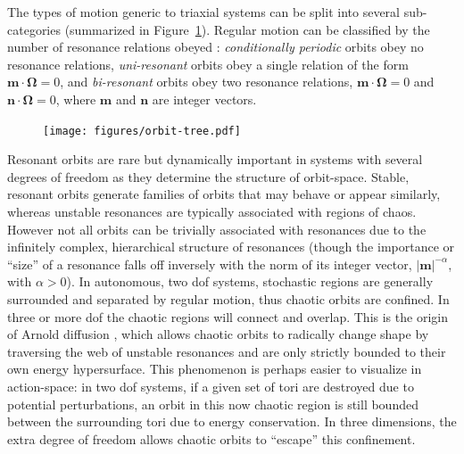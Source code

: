 \documentclass[letterpaper,12pt,preprint]{aastex}
\newcommand{\bs}[1]{\boldsymbol{#1}}
\begin{document}
The types of motion generic to triaxial systems can be split into several sub-categories (summarized in Figure~\ref{fig:orbit-tree}). Regular motion can be classified by the number of resonance relations obeyed \citep[e.g.,][]{lichtenberg83, valluri98}: \emph{conditionally periodic} orbits obey no resonance relations, \emph{uni-resonant} orbits obey a single relation of the form $\bs{m}\cdot\bs{\Omega}=0$, and \emph{bi-resonant} orbits obey two resonance relations, $\bs{m}\cdot\bs{\Omega}=0$ and $\bs{n}\cdot\bs{\Omega}=0$, where $\bs{m}$ and $\bs{n}$ are integer vectors.

\begin{figure}[!h]
\begin{center}
\texttt{[image: figures/orbit-tree.pdf]}
\caption{} \label{fig:orbit-tree}
\end{center}
\end{figure}

Resonant orbits are rare \citep{merritt99} but dynamically important in systems with several degrees of freedom as they determine the structure of orbit-space. Stable, resonant orbits generate families of orbits that may behave or appear similarly, whereas unstable resonances are typically associated with regions of chaos. However not all orbits can be trivially associated with resonances due to the infinitely complex, hierarchical structure of resonances (though the importance or ``size'' of a resonance falls off inversely with the norm of its integer vector, $|\bs{m}|^{-\alpha}$, with $\alpha > 0$). In autonomous, two dof systems, stochastic regions are generally surrounded and separated by regular motion, thus chaotic orbits are confined. In three or more dof the chaotic regions will connect and overlap. This is the origin of Arnold diffusion \citep{arnold64}, which allows chaotic orbits to radically change shape by traversing the web of unstable resonances and are only strictly bounded to their own energy hypersurface. This phenomenon is perhaps easier to visualize in action-space: in two dof systems, if a given set of tori are destroyed due to potential perturbations, an orbit in this now chaotic region is still bounded between the surrounding tori due to energy conservation. In three dimensions, the extra degree of freedom allows chaotic orbits to ``escape'' this confinement.
\end{document}
